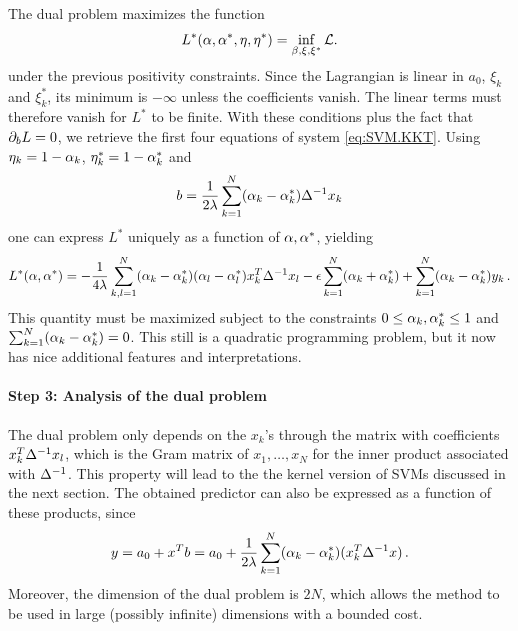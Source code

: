 The dual problem maximizes the function 
$$
L^*(\alpha, \alpha^*, \eta, \eta^*) = \inf_{\beta, \xi, \xi^*} \mathcal L.
$$
 under the previous
positivity constraints. 
Since the Lagrangian is linear in ${a_0}$,
$\xi_k$ and $\xi_k^*$, its minimum is $-\infty$ unless the
coefficients vanish. The linear terms must therefore vanish for $L^*$ to be finite. With these conditions plus the fact that  $\partial_b L = 0$, we retrieve the first four equations of system \eqref{eq:SVM.KKT}. 
Using $\eta_k  = 1- \alpha_k$, $\eta_k^* = 1- \alpha_k^*$ and 
\begin{equation}
\label{eq:svm.lin.b}
b = \frac1{2\lambda} \sum_{k=1}^N (\alpha_k-\alpha_k^*) \Delta^{-1} x_k
\end{equation}
one can 
express $L^*$ uniquely as a function of $\alpha, \alpha^*$, yielding
$$
L^*(\alpha, \alpha^*) = -\frac{1}{4\lambda} \sum_{k,l=1}^N
(\alpha_k-\alpha_k^*)(\alpha_l-\alpha_l^*) x_k^T\Delta^{-1} x_l - \epsilon \sum_{k=1}^N
(\alpha_k+\alpha_k^*) + \sum_{k=1}^N (\alpha_k-\alpha_k^*)y_k\,.
$$
This quantity must be maximized subject to the constraints  $0\leq \alpha_k,
\alpha_k^*\leq 1$ and $\sum_{k=1}^N (\alpha_k-\alpha_k^*) = 0$. This still is
a quadratic programming problem, but it now has nice additional features
and interpretations.


\paragraph{Step 3: Analysis of the dual problem}
The dual problem only depends on the $x_k$'s
through the matrix with coefficients $x_k^T\Delta^{-1} x_l$, which is the Gram matrix of $x_1, \ldots, x_N$ for the inner product associated with $\Delta^{-1}$. This property will lead to the the kernel version of SVMs discussed in the next section. The obtained predictor can
also be expressed as a function of these products, since
$$
y = {a_0} + x^T b = {a_0} + \frac{1}{2\lambda} \sum_{k=1}^N (\alpha_k-\alpha_k^*)
(x_k^T\Delta^{-1} x)\,.
$$
Moreover, the dimension of the dual problem is $2N$, which  allows the method to be used in large (possibly infinite) dimensions with a bounded cost.

